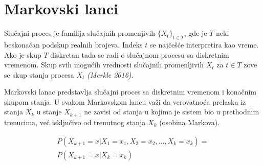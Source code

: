\documentclass[12pt, journal, compsoc]{IEEEtran}
\begin{document}
%


\section{Markovski lanci}
Slučajni proces je familija slučajnih promenjivih $\{X_t\}_{t \in T}$, gde je $T$ neki beskonačan podskup realnih brojeva. Indeks $t$ se najčešće interpretira kao vreme. Ako je skup $T$ diskretan tada se radi o slučajnom procesu sa diskretnim vremenom. Skup svih mogućih vrednosti slučajnih promenljivih $X_t$ za $t \in T$ zove se skup stanja procesa $X_t$ \textit{(Merkle 2016)}.

Markovski lanac predstavlja slučajni proces sa diskretnim vremenom i konačnim skupom stanja. U svakom Markovskom lancu važi da verovatnoća prelaska iz stanja $X_k$ u stanje $X_{k+1}$ ne zavisi od stanja u kojima je sistem bio u prethodnim trenucima, već isključivo od trenutnog stanja $X_k$ (osobina Markova).

\begin{equation*}
\begin{aligned}
P(X_{k+1} = x | X_{1} = x_{1}, X_{2} = x_{2}, ...,  X_{k} = x_{k}) =\\ P(X_{k+1} = x| X_{k} = x_{k})
\end{aligned}
\end{equation*}
\end{document}

